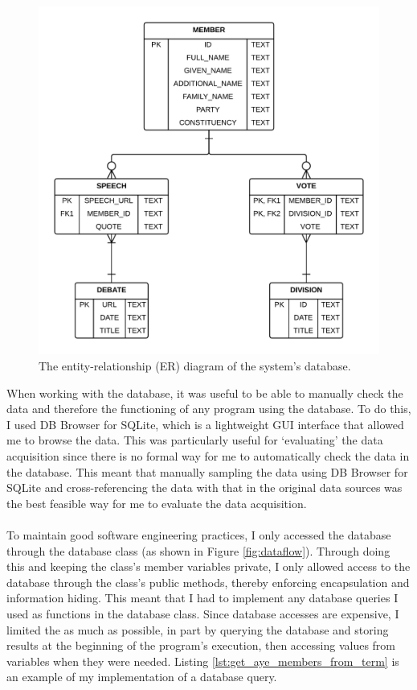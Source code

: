 \documentclass[12pt,a4paper,twoside,openright]{report}
\newcommand{\mylisting}[4]{}
\newcommand{\pylisting}[2]{\mylisting{Python}{py}{#1}{#2}}
\begin{document}
\begin{figure}
	\includegraphics[width=\linewidth]{figs/erd.png}
	\caption{The entity-relationship (ER) diagram of the system's database.}
	\label{fig:erdiagram}
\end{figure}
When working with the database, it was useful to be able to manually check the data and therefore the functioning of any program using the database. To do this, I used DB Browser for SQLite, which is a lightweight GUI interface that allowed me to browse the data. This was particularly useful for `evaluating' the data acquisition since there is no formal way for me to automatically check the data in the database. This meant that manually sampling the data using DB Browser for SQLite and cross-referencing the data with that in the original data sources was the best feasible way for me to evaluate the data acquisition.
\\\\
To maintain good software engineering practices, I only accessed the database through the database class (as shown in Figure \ref{fig:dataflow}). Through doing this and keeping the class's member variables private, I only allowed access to the database through the class's public methods, thereby enforcing encapsulation and information hiding. This meant that I had to implement any database queries I used as functions in the database class. Since database accesses are expensive, I limited the as much as possible, in part by querying the database and storing results at the beginning of the program's execution, then accessing values from variables when they were needed. Listing \ref{lst:get_aye_members_from_term} is an example of my implementation of a database query.
\\\\
\pylisting{Function that performs a query on the database to get the ids of all the MPs who voted `aye' in a given vote and spoke in a debate whose title contains a given term.}{get_aye_members_from_term}
\end{document}
